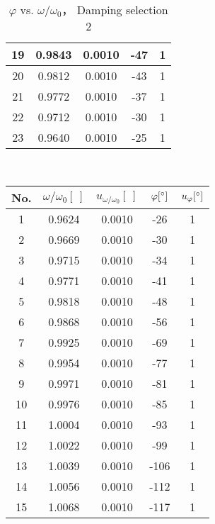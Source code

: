\begin{figure}[H]
\begin{minipage}{0.4\textwidth}
\begin{table}[H]
\begin{tabular}{|c|c|c|c|c|}
                19 & 0.9843 & 0.0010 & -47 & 1\\\hline
                20 & 0.9812 & 0.0010 & -43 & 1\\\hline
                21 & 0.9772 & 0.0010 & -37 & 1\\\hline
                22 & 0.9712 & 0.0010 & -30 & 1\\\hline
                23 & 0.9640 & 0.0010 & -25 & 1\\\hline
            \end{tabular}
            \caption{$\varphi$ vs. $\omega/\omega_0$， Damping selection 2}\label{data_phi2}
        \end{table}
    \end{minipage}
    ~
    \begin{minipage}{0.4\textwidth}
        \begin{table}[H]
        \centering
            \begin{tabular}{|c|c|c|c|c|}
                \hline
                No. & $\omega/\omega_0[\ ]$ & $u_{\omega/\omega_0}[\ ]$ & $\varphi[^\circ]$ & $u_{\varphi}[^\circ]$\\\hline
                1 & 0.9624 & 0.0010 & -26 & 1\\\hline
                2 & 0.9669 & 0.0010 & -30 & 1\\\hline
                3 & 0.9715 & 0.0010 & -34 & 1\\\hline
                4 & 0.9771 & 0.0010 & -41 & 1\\\hline
                5 & 0.9818 & 0.0010 & -48 & 1\\\hline
                6 & 0.9868 & 0.0010 & -56 & 1\\\hline
                7 & 0.9925 & 0.0010 & -69 & 1\\\hline
                8 & 0.9954 & 0.0010 & -77 & 1\\\hline
                9 & 0.9971 & 0.0010 & -81 & 1\\\hline
                10 & 0.9976 & 0.0010 & -85 & 1\\\hline
                11 & 1.0004 & 0.0010 & -93 & 1\\\hline
                12 & 1.0022 & 0.0010 & -99 & 1\\\hline
                13 & 1.0039 & 0.0010 & -106 & 1\\\hline
                14 & 1.0056 & 0.0010 & -112 & 1\\\hline
                15 & 1.0068 & 0.0010 & -117 & 1\\\hline

\end{tabular}
\end{table}
\end{minipage}
\end{figure}
